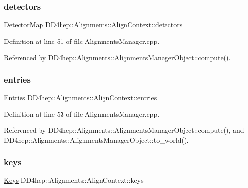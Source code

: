 \subsubsection{\texorpdfstring{detectors}{detectors}}
{\footnotesize\ttfamily \hyperlink{class_d_d4hep_1_1_alignments_1_1_align_context_a87b50a8f7563aefb2944aebe2d5bb33e}{Detector\+Map} D\+D4hep\+::\+Alignments\+::\+Align\+Context\+::detectors}



Definition at line 51 of file Alignments\+Manager.\+cpp.



Referenced by D\+D4hep\+::\+Alignments\+::\+Alignments\+Manager\+Object\+::compute().

\hypertarget{class_d_d4hep_1_1_alignments_1_1_align_context_a7ac8a0b3a176098807efafdc3a429cd5}{}\label{class_d_d4hep_1_1_alignments_1_1_align_context_a7ac8a0b3a176098807efafdc3a429cd5} 
\subsubsection{\texorpdfstring{entries}{entries}}
{\footnotesize\ttfamily \hyperlink{class_d_d4hep_1_1_alignments_1_1_align_context_a1b5a088a6d88177089055193c11aa67c}{Entries} D\+D4hep\+::\+Alignments\+::\+Align\+Context\+::entries}



Definition at line 53 of file Alignments\+Manager.\+cpp.



Referenced by D\+D4hep\+::\+Alignments\+::\+Alignments\+Manager\+Object\+::compute(), and D\+D4hep\+::\+Alignments\+::\+Alignments\+Manager\+Object\+::to\+\_\+world().

\hypertarget{class_d_d4hep_1_1_alignments_1_1_align_context_ab4f2ddd57d4f86566bb37d5c6779b6d2}{}\label{class_d_d4hep_1_1_alignments_1_1_align_context_ab4f2ddd57d4f86566bb37d5c6779b6d2} 
\subsubsection{\texorpdfstring{keys}{keys}}
{\footnotesize\ttfamily \hyperlink{class_d_d4hep_1_1_alignments_1_1_align_context_afed2b1b68f90bb0129bd51a08904332b}{Keys} D\+D4hep\+::\+Alignments\+::\+Align\+Context\+::keys}



